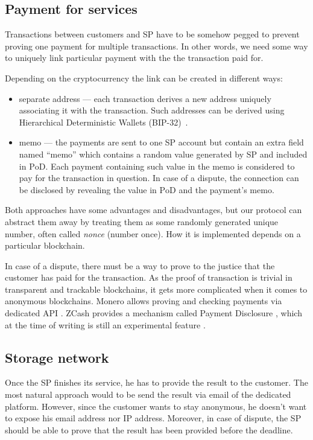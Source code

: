 \documentclass{ieeeaccess}
\begin{document}
\subsection{Payment for services}\label{payment-for-services}
Transactions between customers and SP have to be somehow pegged to prevent proving one payment for multiple transactions. In other
words, we need some way to uniquely link particular payment with the
the transaction paid for.

Depending on the cryptocurrency the link can be created in different
ways:

\begin{itemize}

\item
  separate address — each transaction derives a new address uniquely
  associating it with the transaction. Such addresses can be derived
  using Hierarchical Deterministic Wallets (BIP-32)~\cite{bipsbip089}.
\item
  memo — the payments are sent to one SP account but contain an extra
  field named ``memo'' which contains a random value generated by SP and
  included in $\mathrm{PoD}$. Each payment containing such value in the memo is
  considered to pay for the transaction in question. In case of a dispute,
  the connection can be disclosed by revealing the value in $\mathrm{PoD}$ and the payment's memo.
\end{itemize}

Both approaches have some advantages and disadvantages, but our protocol can abstract them away by treating them as some randomly generated unique number, often called \textit{nonce} (number once). How it is implemented depends on a particular blockchain.

In case of a dispute, there must be a way to prove to the justice that the customer has paid for the transaction. As the proof of transaction is trivial in transparent and trackable blockchains, it gets more complicated when it comes to anonymous blockchains. Monero allows proving and checking payments via dedicated API \cite{Howtopro46}. ZCash provides a mechanism called Payment Disclosure \cite{AnIntrod25}, which at the time of writing is still an experimental feature
\cite{paymentd11}.

\subsection{Storage network}\label{storage-network}
Once the SP finishes its service, he has to provide the result to the customer. The most natural approach would to be send the result via email of the dedicated platform. However, since the customer wants to stay anonymous, he doesn't want to expose his email address nor IP address. Moreover, in case of dispute, the SP should be able to prove that the result has been provided before the deadline.
\end{document}
